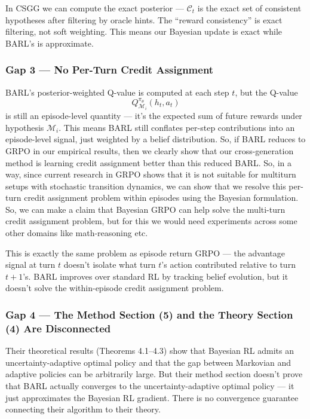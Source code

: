 \documentclass[11pt]{article}
\theoremstyle{plain}
\theoremstyle{definition}
\theoremstyle{remark}
\begin{document}
In CSGG we can compute the exact posterior --- $\mathcal{C}_t$ is the exact set of consistent hypotheses after filtering by oracle hints. The ``reward consistency'' is exact filtering, not soft weighting. This means our Bayesian update is exact while BARL's is approximate.

\subsubsection{Gap 3 --- No Per-Turn Credit Assignment}

BARL's posterior-weighted Q-value is computed at each step $t$, but the Q-value
\[
Q^{\pi_\theta}_{\mathcal{M}_i}(h_t,a_t)
\]
is still an episode-level quantity --- it's the expected sum of future rewards under hypothesis $\mathcal{M}_i$. This means BARL still conflates per-step contributions into an episode-level signal, just weighted by a belief distribution. So, if BARL reduces to GRPO in our empirical results, then we clearly show that our cross-generation method is learning credit assignment better than this reduced BARL. So, in a way, since current research in GRPO shows that it is not suitable for multiturn setups with stochastic transition dynamics, we can show that we resolve this per-turn credit assignment problem within episodes using the Bayesian formulation. So, we can make a claim that Bayesian GRPO can help solve the multi-turn credit assignment problem, but for this we would need experiments across some other domains like math-reasoning etc. 

This is exactly the same problem as episode return GRPO --- the advantage signal at turn $t$ doesn't isolate what turn $t$'s action contributed relative to turn $t+1$'s. BARL improves over standard RL by tracking belief evolution, but it doesn't solve the within-episode credit assignment problem.

\subsubsection{Gap 4 --- The Method Section (5) and the Theory Section (4) Are Disconnected}

Their theoretical results (Theorems 4.1--4.3) show that Bayesian RL admits an uncertainty-adaptive optimal policy and that the gap between Markovian and adaptive policies can be arbitrarily large. But their method section doesn't prove that BARL actually converges to the uncertainty-adaptive optimal policy --- it just approximates the Bayesian RL gradient. There is no convergence guarantee connecting their algorithm to their theory.
\end{document}
